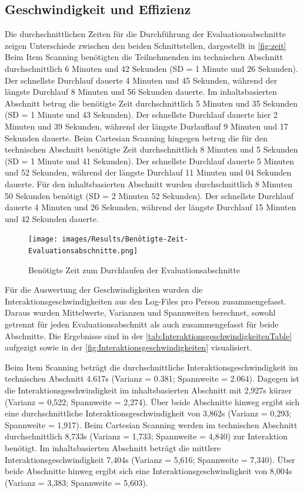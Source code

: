 \subsection{Geschwindigkeit und Effizienz}

Die durchschnittlichen Zeiten für die Durchführung der Evaluationsabschnitte zeigen Unterschiede zwischen den beiden Schnittstellen, dargestellt in \autoref{fig:zeit} Beim Item Scanning benötigten die Teilnehmenden im technischen Abschnitt durchschnittlich 6 Minuten und 42 Sekunden (SD = 1 Minute und 26 Sekunden). Der schnellste Durchlauf dauerte 4 Minuten und 45 Sekunden, während der längste Durchlauf 8 Minuten und 56 Sekunden dauerte. Im inhaltsbasierten Abschnitt betrug die benötigte Zeit durchschnittlich 5 Minuten und 35 Sekunden (SD = 1 Minute und 43 Sekunden). Der schnellste Durchlauf dauerte hier 2 Minuten und 39 Sekunden, während der längste Durlauflauf 9 Minuten und 17 Sekunden dauerte. 
Beim Cartesian Scanning hingegen betrug die für den technischen Abschnitt benötigte Zeit durchschnittlich 8 Minuten und 5 Sekunden (SD = 1 Minute und 41 Sekunden). Der schnellste Durchlauf dauerte 5 Minuten und 52 Sekunden, während der längste Durchlauf 11 Minuten und 04 Sekunden dauerte. Für den inhaltsbasierten Abschnitt wurden durchschnittlich 8 Minuten 50 Sekunden benötigt (SD = 2 Minuten 52 Sekunden). Der schnellste Durchlauf dauerte 4 Minuten und 26 Sekunden, während der längste Durchlauf 15 Minuten und 42 Sekunden dauerte.

\begin{figure}[tbh]
    \centering
    \texttt{[image: images/Results/Benötigte-Zeit-Evaluationsabschnitte.png]}
    \caption{Benötigte Zeit zum Durchlaufen der Evaluationsabschnitte}
    \label{fig:zeit}
\end{figure}

Für die Auswertung der Geschwindigkeiten wurden die Interaktionsgeschwindigkeiten aus den Log-Files pro Person zusammengefasst. Daraus wurden Mittelwerte, Varianzen und Spannweiten berechnet, sowohl getrennt für jeden Evaluationsabschnitt als auch zusammengefasst für beide Abschnitte. Die Ergebnisse sind in der \autoref{tab:InteraktionsgeschwindigkeitenTable} aufgezigt sowie in der \autoref{fig:Interaktionsgeschwindigkeiten} visualisiert. 

Beim Item Scanning beträgt die durchschnittliche Interaktionsgeschwindigkeit im technischen Abschnitt 4.617s (Varianz = 0.381; Spannweite = 2.064). Dagegen ist die Interaktionsgeschwindigkeit im inhaltsbasierten Abschnitt mit 2,927s kürzer (Varianz = 0,522; Spannweite = 2,274). Über beide Abschnitte hinweg ergibt sich eine durchschnittliche Interaktionsgeschwindigkeit von 3,862s (Varianz = 0,293; Spannweite = 1,917).
Beim Cartesian Scanning werden im technischen Abschnitt durchschnittlich 8,733s (Varianz = 1,733; Spannweite = 4,840) zur Interaktion benötigt. Im inhaltsbasierten Abschnitt beträgt die mittlere Interaktionsgeschwindigkeit 7,404s (Varianz = 5,616; Spannweite = 7,340). Über beide Abschnitte hinweg ergibt sich eine Interaktionsgeschwindigkeit von 8,004s (Varianz = 3,383; Spannweite = 5,603).

